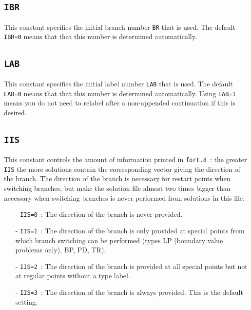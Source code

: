 \documentclass[12pt]{report}
\begin{document}
\subsection{\texttt{IBR}} \label{sec:IBR} 
 This constant specifies the initial branch number {\tt BR} that is
 used. The default {\tt IBR=0} means that that this number is
 determined automatically.

\subsection{\texttt{LAB}} \label{sec:LAB} 
 This constant specifies the initial label number {\tt LAB} that is
 used. The default {\tt LAB=0} means that that this number is
 determined automatically. Using {\tt LAB=1} means you do not need
 to relabel after a non-appended continuation if this is desired.

\subsection{\texttt{IIS}} \label{sec:IIS} 
 This constant controls the amount of information printed in {\tt fort.8}~:
 the greater {\tt IIS} the more solutions contain the corresponding
 vector giving the direction of the branch. The direction of the
 branch is necessary for restart points when switching branches, but
 make the solution file almost two times bigger than necessary when
 switching branches is never performed from solutions in this file.

\begin{itemize}
\item[-] {\tt IIS=0}~:
  The direction of the branch is never provided.
\item[-] {\tt IIS=1}~:
  The direction of the branch is only provided at special points from
  which branch switching can be performed (types LP (boundary value
  problems only), BP, PD, TR).
\item[-] {\tt IIS=2}~:
  The direction of the branch is provided at all special points but
  not at regular points without a type label.
\item[-] {\tt IIS=3}~:
  The direction of the branch is always provided. This is the default
  setting.
\end{itemize}
\end{document}

